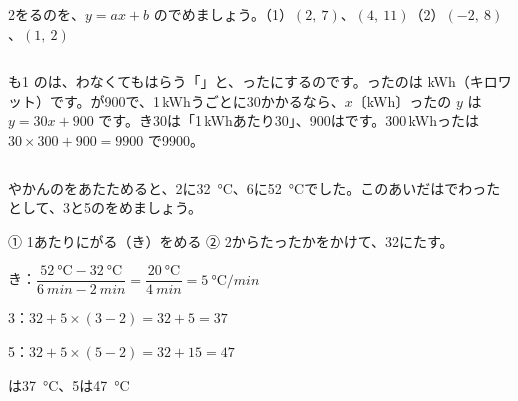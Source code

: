 \begin{jibun}
2をるのを、$y=ax+b$ のでめましょう。（1）\nobreak $(2,\ 7)$、$(4,\ 11)$\quad（2）\nobreak $(-2,\ 8)$、$(1,\ 2)$
\end{jibun}

\begin{column}{も1}
のは、わなくてもはらう「」と、ったにするのです。ったのは kWh（キロワット）です。が900で、1\,kWhうごとに30かかるなら、$x$〔kWh〕ったの $y$ は $y=30x+900$ です。き30は「1\,kWhあたり30」、900はです。300\,kWhったは $30\times300+900=9900$ で9900。
\end{column}



\begin{reidai}
やかんのをあたためると、2に\qty{32}{\degreeCelsius}、6に\qty{52}{\degreeCelsius}でした。このあいだはでわったとして、3と5のをめましょう。\par
\kangaekata ① 1あたりにがる（き）をめる ② 2からたったかをかけて、32にたす。\par
\shiki {}き：$\dfrac{\qty{52}{\degreeCelsius}-\qty{32}{\degreeCelsius}}{\qty{6}{min}-\qty{2}{min}}=\dfrac{\qty{20}{\degreeCelsius}}{\qty{4}{min}}=\qty{5}{\degreeCelsius/min}$\par
\hspace*{2.6\zw}3：$32+5\times(3-2)=32+5=37$\par
\hspace*{2.6\zw}5：$32+5\times(5-2)=32+15=47$\par
{}は\qty{37}{\degreeCelsius}、5は\qty{47}{\degreeCelsius}
\end{reidai}

